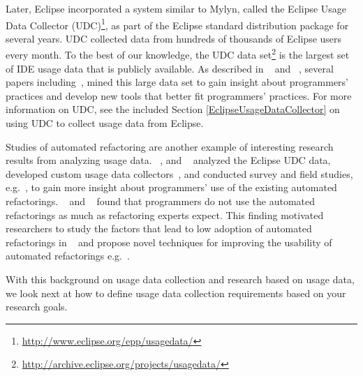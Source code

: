 %
Later, Eclipse incorporated a system similar to Mylyn, called the Eclipse Usage
Data Collector (UDC)\footnote{\url{http://www.eclipse.org/epp/usagedata/}}, as part of the Eclipse standard
distribution package for several years. UDC collected data from hundreds of
thousands of Eclipse users every month. To the best of our knowledge, the UDC
data set\footnote{\url{http://archive.eclipse.org/projects/usagedata/}} is the largest set of IDE usage data that is publicly
available. As described in ~\citep{MurphyHill2012Improving} and ~\citep{VakilianETAL2013Compositional}, several papers including~\citep{VakilianJohnson2014Alternate,VakilianETAL2013Compositional,V:MurphyHill2012How}, mined this large
data set to gain insight about programmers' practices and develop new tools that better fit programmers' practices.
For more information on UDC, see the included Section \ref {EclipseUsageDataCollector} on using UDC to collect usage data from Eclipse.

Studies of automated refactoring are another example of interesting research results from analyzing usage data. ~\citet{VakilianETAL2013Compositional}, and ~\citet{V:MurphyHill2012How} analyzed the Eclipse UDC
data, developed
custom usage data collectors~\citep{VakilianETAL2012UseDisuseMisuse}, and
conducted survey and field studies,  e.g.~\citep{V:MurphyHill2012How,VakilianJohnson2014Alternate,NegaraETAL2013ManualRefactorings}, to gain more
insight about programmers' use of the existing automated refactorings. ~\citet{V:MurphyHill2012How} and
~\citet{NegaraETAL2013ManualRefactorings}
 found that programmers do not use the automated refactorings as
much as refactoring experts expect. This finding motivated researchers to study
the factors that lead to low adoption of automated
refactorings in ~\citep{VakilianETAL2012UseDisuseMisuse,V:MurphyHill2012How} and
propose novel techniques for improving the usability of automated
refactorings e.g.~\citep{V:MurphyHill2012How,MurphyHill2012Improving,MurphyHill2008ExtractMethod,LeeETAL2013DragDrop,MurphyHillETAL2011Gestures,GeETAL2012BeneFactor,FosterETAL2012WitchDoctor}.

With this background on usage data collection and research based on usage data, we look next at how to define usage data collection requirements based on your research goals.

